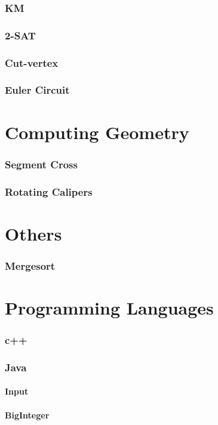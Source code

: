 \documentclass[a4paper, twocolumn, landscape]{article}
\begin{document}
\section{KM}

\section{2-SAT}

\section{Cut-vertex}

\section{Euler Circuit}


\part{Computing Geometry}
\section{Segment Cross}

\section{Rotating Calipers}


\part{Others}
\section{Mergesort}


\part{Programming Languages}
\section{c++}


\section{Java}
\subsection*{Input}

\subsection*{BigInteger}

\end{document}

